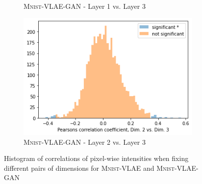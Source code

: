\documentclass{beamer}
\begin{document}
\begin{frame}
\begin{figure}
\begin{subfigure}{.3\textwidth}
\caption{\textsc{Mnist}-VLAE-GAN - Layer 1 vs. Layer 3}
\end{subfigure}
\hfill
\begin{subfigure}{.3\textwidth}
\includegraphics[width=\textwidth]{images/notprop/dsprites/vlae_gan/dim_2_3.png}
\caption{\textsc{Mnist}-VLAE-GAN - Layer 2 vs. Layer 3}
\end{subfigure}
\caption{Histogram of correlations of pixel-wise intensities when fixing different pairs of dimensions for \textsc{Mnist}-VLAE and \textsc{Mnist}-VLAE-GAN}
\end{figure}
\end{frame}
\end{document}
